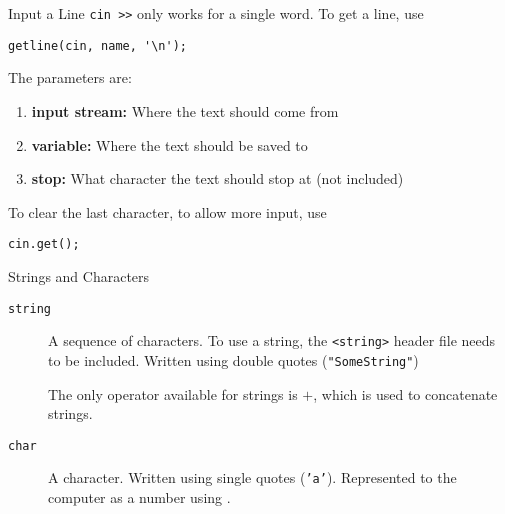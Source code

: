 \documentclass[\main/notes.tex]{subfiles}
\begin{document}
			\begin{sidenote}{Input a Line}
				\texttt{cin >>} only works for a single word. To get a line, use
				\begin{indentparagraph}
					\begin{verbatim}
getline(cin, name, '\n');
					\end{verbatim}
				\end{indentparagraph}
				The parameters are:
				\begin{enumerate}[nosep]
					\item \textbf{input stream:} Where the text should come from
					\item \textbf{variable:} Where the text should be saved to
					\item \textbf{stop:} What character the text should stop at (not included)
				\end{enumerate}
				To clear the last character, to allow more input, use
				\begin{indentparagraph}
					\begin{verbatim}
cin.get();
					\end{verbatim}
				\end{indentparagraph}
			\end{sidenote}
			\pagebreak
			\begin{definition}{Strings and Characters}
				\begin{description}
					\item[\texttt{string}] A sequence of characters. To use a string, the \texttt{<string>} header file needs to be included. Written using double quotes (\texttt{"SomeString"})

						The only operator available for strings is $+$, which is used to concatenate strings.
					\item[\texttt{char}] A character. Written using single quotes (\texttt{'a'}). Represented to the computer as a number using .
				\end{description}
			\end{definition}
\end{document}
